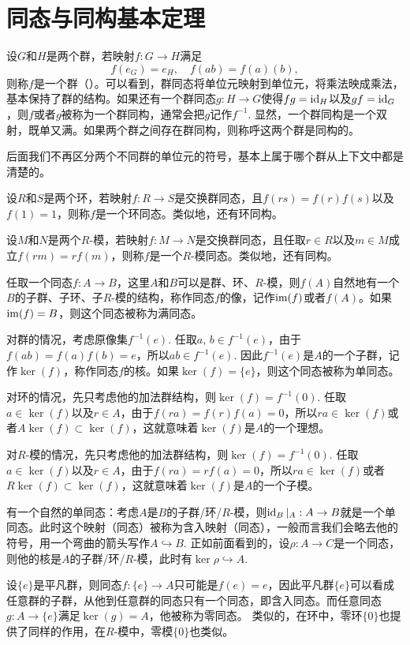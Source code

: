 \section{同态与同构基本定理}

\para 设$G$和$H$是两个群，若映射$f:G\to H$满足
\[
	f(e_G)=e_H,\quad f(ab)=f(a)(b),
\]
则称$f$是一个群（）。可以看到，群同态将单位元映射到单位元，将乘法映成乘法，基本保持了群的结构。如果还有一个群同态$g:H\to G$使得$fg=\operatorname{id}_H$以及$gf=\operatorname{id}_G$，则$f$或者$g$被称为一个群同构，通常会把$g$记作$f^{-1}$. 显然，一个群同构是一个双射，既单又满。如果两个群之间存在群同构，则称呼这两个群是同构的。

后面我们不再区分两个不同群的单位元的符号，基本上属于哪个群从上下文中都是清楚的。

\para 设$R$和$S$是两个环，若映射$f:R\to S$是交换群同态，且$f(rs)=f(r)f(s)$以及$f(1)=1$，则称$f$是一个环同态。类似地，还有环同构。

设$M$和$N$是两个$R$-模，若映射$f:M\to N$是交换群同态，且任取$r\in R$以及$m\in M$成立$f(rm)=rf(m)$，则称$f$是一个$R$-模同态。类似地，还有同构。

\para 任取一个同态$f:A\to B$，这里$A$和$B$可以是群、环、$R$-模，则$f(A)$自然地有一个$B$的子群、子环、子$R$-模的结构，称作同态$f$的像，记作$\operatorname{im}(f)$或者$f(A)$。如果$\operatorname{im}(f)=B$，则这个同态被称为满同态。

对群的情况，考虑原像集$f^{-1}(e)$. 任取$a$, $b\in f^{-1}(e)$，由于$f(ab)=f(a)f(b)=e$，所以$ab\in f^{-1}(e)$. 因此$f^{-1}(e)$是$A$的一个子群，记作$\ker(f)$，称作同态$f$的核。如果$\ker(f)=\{e\}$，则这个同态被称为单同态。

对环的情况，先只考虑他的加法群结构，则$\ker(f)=f^{-1}(0)$. 任取$a\in \ker(f)$以及$r\in A$，由于$f(ra)=f(r)f(a)=0$，所以$ra\in \ker(f)$或者$A\ker(f)\subset \ker(f)$，这就意味着$\ker(f)$是$A$的一个理想。

对$R$-模的情况，先只考虑他的加法群结构，则$\ker(f)=f^{-1}(0)$. 任取$a\in \ker(f)$以及$r\in A$，由于$f(ra)=rf(a)=0$，所以$ra\in \ker(f)$或者$R\ker(f)\subset \ker(f)$，这就意味着$\ker(f)$是$A$的一个子模。

\para 有一个自然的单同态：考虑$A$是$B$的子群/环/$R$-模，则$\operatorname{id}_B|_A:A\to B$就是一个单同态。此时这个映射（同态）被称为含入映射（同态），一般而言我们会略去他的符号，用一个弯曲的箭头写作$A\hookrightarrow B$. 正如前面看到的，设$\rho:A\to C$是一个同态，则他的核是$A$的子群/环/$R$-模，此时有$\ker\rho\hookrightarrow A$.

设$\{e\}$是平凡群，则同态$f:\{e\}\to A$只可能是$f(e)=e$，因此平凡群$\{e\}$可以看成任意群的子群，从他到任意群的同态只有一个同态，即含入同态。而任意同态$g:A\to \{e\}$满足$\ker(g)=A$，他被称为零同态。 类似的，在环中，零环$\{0\}$也提供了同样的作用，在$R$-模中，零模$\{0\}$也类似。

